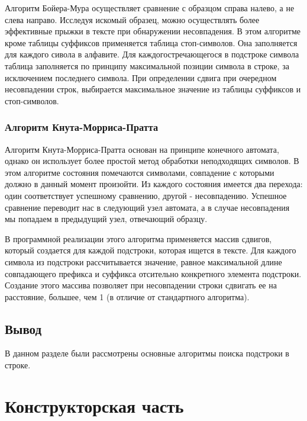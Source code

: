 \documentclass[a4paper,12pt]{report}
\begin{document}
		Алгоритм Бойера-Мура осуществляет сравнение с образцом справа налево, а не слева направо. 
		Исследуя искомый образец, можно осуществлять более эффективные прыжки в тексте при обнаружении несовпадения. 
		В этом алгоритме кроме таблицы суффиксов применяется таблица стоп-символов. 
		Она заполняется для каждого сивола в алфавите. 
		Для каждогостречающегося в подстроке символа таблица заполняется по принципу максимальной позиции символа в строке, за исключением последнего символа. 
		При определении сдвига при очередном несовпадении строк, выбирается максимальное значение из таблицы суффиксов и стоп-символов\cite{2}.
		
	\subsection{Алгоритм Кнута-Морриса-Пратта}	
		
		Алгоритм Кнута-Морриса-Пратта основан на принципе конечного автомата, однако он использует более простой метод обработки неподходящих символов. 
		В этом алгоритме состояния помечаются символами, совпадение с которыми должно в данный момент произойти. 
		Из каждого состояния имеется два перехода: один соответствует успешному сравнению, другой - несовпадению. 
		Успешное сравнение переводит нас в следующий узел автомата, а в случае несовпадения мы попадаем в предыдущий узел, отвечающий образцу.
		 
		В программной реализации этого алгоритма применяется массив сдвигов, который создается для каждой подстроки, которая ищется в тексте. 
		Для каждого символа из подстроки рассчитывается значение, равное максимальной длине совпадающего префикса и суффикса отсительно конкретного элемента подстроки. 
		Создание этого массива позволяет при несовпадении строки сдвигать ее на расстояние, большее, чем 1 (в отличие от стандартного алгоритма).
		
	\section{Вывод}

		В данном разделе были рассмотрены основные алгоритмы поиска подстроки в строке.
	
    \newpage

    \chapter{Конструкторская часть}
        \label{sec:construct_part}
        
\end{document}

